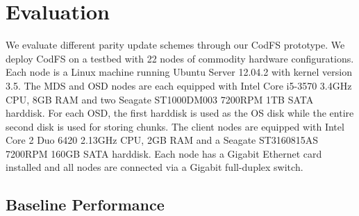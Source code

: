 \chapter{Evaluation}
\label{sec:evaluation}

We evaluate different parity update schemes through our CodFS prototype. We
deploy CodFS on a testbed with 22 nodes of commodity hardware configurations.
Each node is a Linux machine running Ubuntu Server 12.04.2 with kernel version
3.5. The MDS and OSD nodes are each equipped with Intel Core i5-3570 3.4GHz
CPU, 8GB RAM and two Seagate
ST1000DM003 7200RPM 1TB SATA harddisk. For each OSD, the first harddisk is used
as the OS disk while the entire second disk is used for storing chunks. The
client nodes are equipped with Intel Core 2 Duo 6420 2.13GHz CPU, 2GB RAM and a
Seagate ST3160815AS 7200RPM 160GB SATA harddisk. Each node has a Gigabit
Ethernet card installed and all nodes are connected via a Gigabit full-duplex
switch.

\section{Baseline Performance}
\label{sec:evaluation_baseline}

